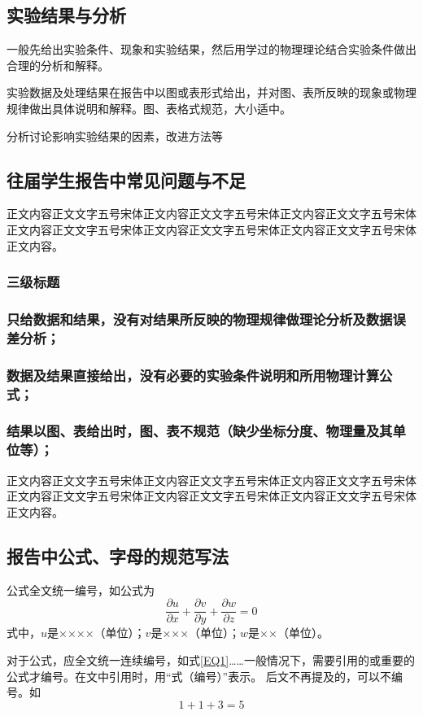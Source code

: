 \documentclass{gjm_report}
\begin{document}
\begin{multicols}{2}
\section{实验结果与分析}
一般先给出实验条件、现象和实验结果，然后用学过的物理理论结合实验条件做出合理的分析和解释。

实验数据及处理结果在报告中以图或表形式给出，并对图、表所反映的现象或物理规律做出具体说明和解释。图、表格式规范，大小适中。

分析讨论影响实验结果的因素，改进方法等

  \subsection{往届学生报告中常见问题与不足}
  正文内容正文文字五号宋体正文内容正文文字五号宋体正文内容正文文字五号宋体正文内容正文文字五号宋体正文内容正文文字五号宋体正文内容正文文字五号宋体正文内容。
    \subsubsection{三级标题}
    \subsubsection{只给数据和结果，没有对结果所反映的物理规律做理论分析及数据误差分析；}
    \subsubsection{数据及结果直接给出，没有必要的实验条件说明和所用物理计算公式；}
    \subsubsection{结果以图、表给出时，图、表不规范（缺少坐标分度、物理量及其单位等）；}
    正文内容正文文字五号宋体正文内容正文文字五号宋体正文内容正文文字五号宋体正文内容正文文字五号宋体正文内容正文文字五号宋体正文内容正文文字五号宋体正文内容。
  \subsection{报告中公式、字母的规范写法}
  公式全文统一编号，如公式为
  \begin{equation}\label{EQ1}
    \frac{\partial u}{\partial x}+\frac{\partial v}{\partial y}+\frac{\partial w}{\partial z}=0
  \end{equation}
  式中，$u$是××××（单位）；$v$是×××（单位）；$w$是××（单位）。

  对于公式，应全文统一连续编号，如式\eqref{EQ1}……一般情况下，需要引用的或重要的公式才编号。在文中引用时，用“式（编号）”表示。
  后文不再提及的，可以不编号。如
  \begin{equation*}
    1 + 1 + 3 = 5
  \end{equation*}


\end{multicols}
\end{document}
